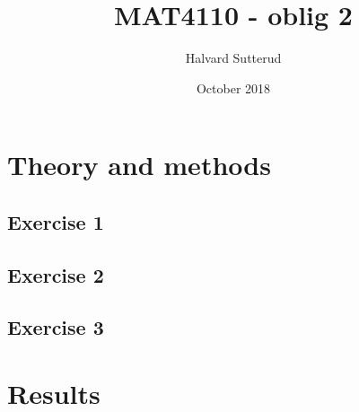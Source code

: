\documentclass[a11paper, 10pt]{article}
\title{MAT4110 - oblig 2}
\author{Halvard Sutterud }
\date{October 2018}
\begin{document}
\maketitle

\section{Theory and methods}
\subsection*{Exercise 1}

\subsection*{Exercise 2}

\subsection*{Exercise 3}



\section{Results}
\end{document}
